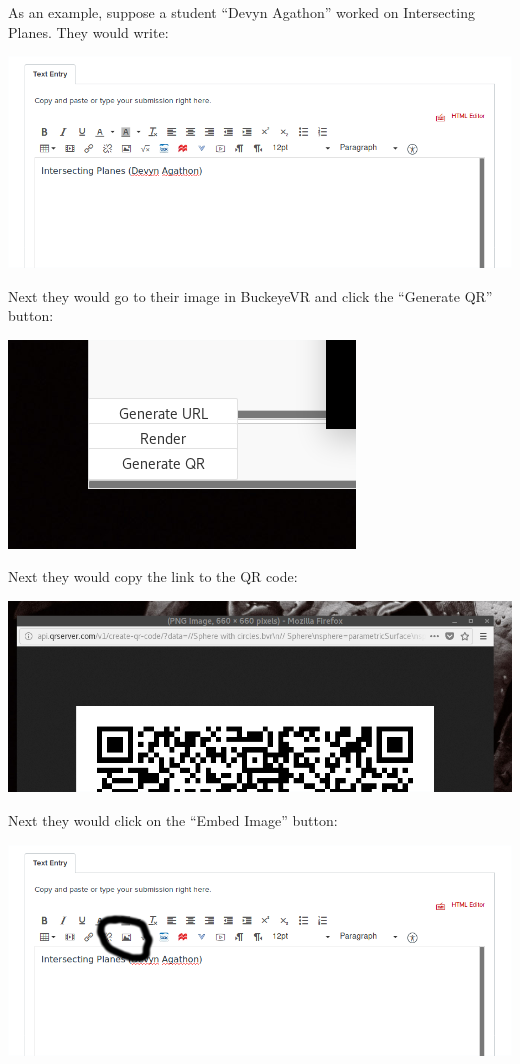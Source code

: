 \documentclass[noauthor,nooutcomes]{ximera}
\begin{document}
As an example, suppose a student ``Devyn Agathon'' worked on Intersecting Planes. They would write:
\begin{image}
  \includegraphics{PartAndName.png}
\end{image}
Next they would go to their image in BuckeyeVR and click the
``Generate QR'' button:
\begin{image}
  \includegraphics{generate.png}
\end{image}
Next they would copy the link to the QR code:
\begin{image}
  \includegraphics{QR.png}
\end{image}
Next they would click on the ``Embed Image'' button:
\begin{image}
  \includegraphics{EmbedImage.png}
\end{image}
\end{document}
